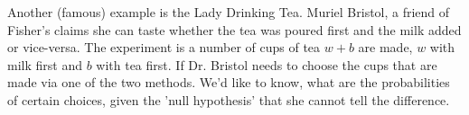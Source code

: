 \documentclass[12pt]{article} %
\begin{document}
Another (famous) example is the Lady Drinking Tea. Muriel Bristol, a friend of Fisher's claims she can taste whether the tea was poured first and the milk added or vice-versa. The experiment is a number of cups of tea $w+b$ are made, $w$ with milk first and $b$ with tea first. If Dr. Bristol needs to choose the cups that are made via one of the two methods. We'd like to know, what are the probabilities of certain choices, given the 'null hypothesis' that she cannot tell the difference. 
\end{document}
